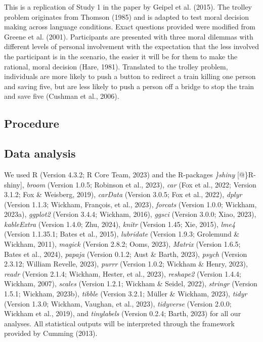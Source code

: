 \documentclass[
  man,floatsintext]{apa7}
\begin{document}
This is a replication of Study 1 in the paper by Geipel et al. (2015). The trolley problem originates from Thomson (1985) and is adapted to test moral decision making across language conditions. Exact questions provided were modified from Greene et al. (2001). Participants are presented with three moral dilemmas with different levels of personal involvement with the expectation that the less involved the participant is in the scenario, the easier it will be for them to make the rational, moral decision (Hare, 1981). Translated to the trolley problem, individuals are more likely to push a button to redirect a train killing one person and saving five, but are less likely to push a person off a bridge to stop the train and save five (Cushman et al., 2006).

\hypertarget{procedure}{%
\subsection{Procedure}\label{procedure}}

\hypertarget{data-analysis}{%
\subsection{Data analysis}\label{data-analysis}}

We used R (Version 4.3.2; R Core Team, 2023) and the R-packages \emph{\}shiny} {[}@\}R-shiny{]}, \emph{broom} (Version 1.0.5; Robinson et al., 2023), \emph{car} (Fox et al., 2022; Version 3.1.2; Fox \& Weisberg, 2019), \emph{carData} (Version 3.0.5; Fox et al., 2022), \emph{dplyr} (Version 1.1.3; Wickham, François, et al., 2023), \emph{forcats} (Version 1.0.0; Wickham, 2023a), \emph{ggplot2} (Version 3.4.4; Wickham, 2016), \emph{ggsci} (Version 3.0.0; Xiao, 2023), \emph{kableExtra} (Version 1.4.0; Zhu, 2024), \emph{knitr} (Version 1.45; Xie, 2015), \emph{lme4} (Version 1.1.35.1; Bates et al., 2015), \emph{lubridate} (Version 1.9.3; Grolemund \& Wickham, 2011), \emph{magick} (Version 2.8.2; Ooms, 2023), \emph{Matrix} (Version 1.6.5; Bates et al., 2024), \emph{papaja} (Version 0.1.2; Aust \& Barth, 2023), \emph{psych} (Version 2.3.12; William Revelle, 2023), \emph{purrr} (Version 1.0.2; Wickham \& Henry, 2023), \emph{readr} (Version 2.1.4; Wickham, Hester, et al., 2023), \emph{reshape2} (Version 1.4.4; Wickham, 2007), \emph{scales} (Version 1.2.1; Wickham \& Seidel, 2022), \emph{stringr} (Version 1.5.1; Wickham, 2023b), \emph{tibble} (Version 3.2.1; Müller \& Wickham, 2023), \emph{tidyr} (Version 1.3.0; Wickham, Vaughan, et al., 2023), \emph{tidyverse} (Version 2.0.0; Wickham et al., 2019), and \emph{tinylabels} (Version 0.2.4; Barth, 2023) for all our analyses. All statistical outputs will be interpreted through the framework provided by Cumming (2013).
\end{document}
